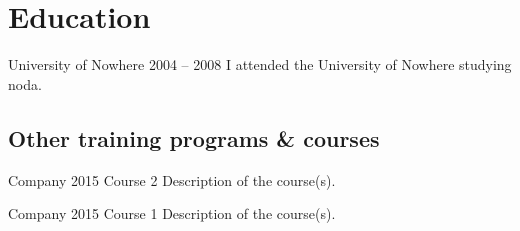 \documentclass{sobCV}[2015/09/08]
\begin{document}
   \section{Education}
   \ednode
      {University of Nowhere}                        %
      {2004 -- 2008}{                                %
      I attended the University of Nowhere studying noda.
   }


   \subsection{Other training programs \& courses}
   \coursenode
      {Company}                                          %
      {2015}                                             %
      {Course 2}{                                        %
      Description of the course(s).
   }

   \coursenode
      {Company}                                          %
      {2015}                                             %
      {Course 1}{                                        %
      Description of the course(s).
   }

\end{document}
